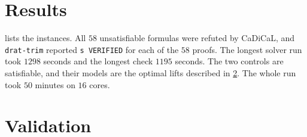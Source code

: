 \documentclass[11pt]{amsart}
\theoremstyle{remark}
\newcommand{\code}[1]{\texttt{#1}}
\begin{document}
\section{Results}\label{sec:results}

 lists the instances. All $58$ unsatisfiable formulas
were refuted by CaDiCaL, and \code{drat-trim} reported \code{s VERIFIED} for
each of the $58$ proofs. The longest solver run took $1298$ seconds and the
longest check $1195$ seconds. The two controls are satisfiable, and
their models are the optimal lifts described in \cref{sec:validation}. The
whole run took $50$ minutes on $16$ cores.



\section{Validation}\label{sec:validation}
\end{document}
